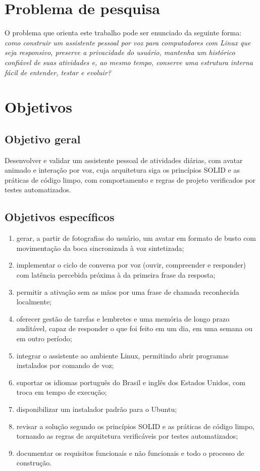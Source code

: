 \section{Problema de pesquisa}

O problema que orienta este trabalho pode ser enunciado da seguinte forma: \emph{como construir um
assistente pessoal por voz para computadores com Linux que seja responsivo, preserve a privacidade do
usuário, mantenha um histórico confiável de suas atividades e, ao mesmo tempo, conserve uma estrutura
interna fácil de entender, testar e evoluir?}

\section{Objetivos}

\subsection{Objetivo geral}

Desenvolver e validar um assistente pessoal de atividades diárias, com avatar animado e interação por
voz, cuja arquitetura siga os princípios SOLID e as práticas de código limpo, com comportamento e
regras de projeto verificados por testes automatizados.

\subsection{Objetivos específicos}

\begin{enumerate}[label=\alph*)]
  \item gerar, a partir de fotografias do usuário, um avatar em formato de busto com movimentação da
        boca sincronizada à voz sintetizada;
  \item implementar o ciclo de conversa por voz (ouvir, compreender e responder) com latência
        percebida próxima à da primeira frase da resposta;
  \item permitir a ativação sem as mãos por uma frase de chamada reconhecida localmente;
  \item oferecer gestão de tarefas e lembretes e uma memória de longo prazo auditável, capaz de
        responder o que foi feito em um dia, em uma semana ou em outro período;
  \item integrar o assistente ao ambiente Linux, permitindo abrir programas instalados por comando de
        voz;
  \item suportar os idiomas português do Brasil e inglês dos Estados Unidos, com troca em tempo de
        execução;
  \item disponibilizar um instalador padrão para o Ubuntu;
  \item revisar a solução segundo os princípios SOLID e as práticas de código limpo, tornando as
        regras de arquitetura verificáveis por testes automatizados;
  \item documentar os requisitos funcionais e não funcionais e todo o processo de construção.
\end{enumerate}

